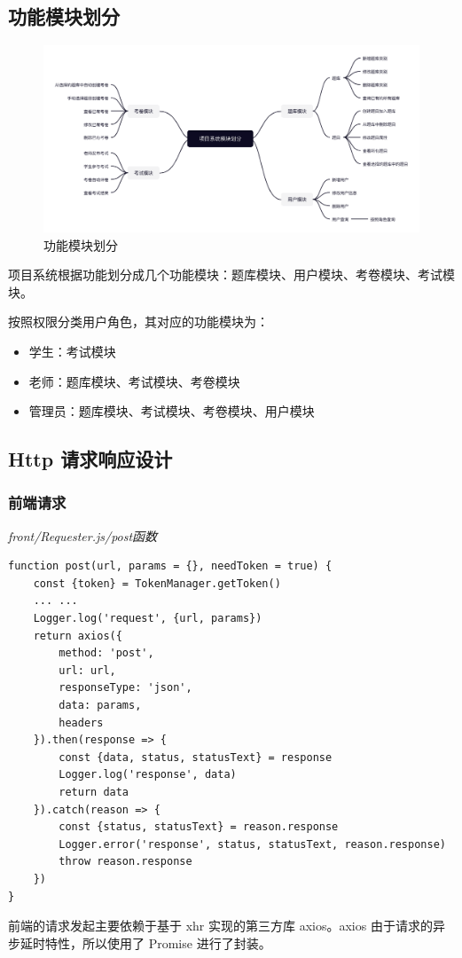 \subsection{功能模块划分}
\begin{figure}[htb]
    \centering
    \includegraphics[width=\linewidth]{_images/功能模块划分.png}
    \caption{功能模块划分}
\end{figure}
项目系统根据功能划分成几个功能模块：题库模块、用户模块、考卷模块、考试模块。

按照权限分类用户角色，其对应的功能模块为：
\begin{itemize}
    \item 学生：考试模块
    \item 老师：题库模块、考试模块、考卷模块
    \item 管理员：题库模块、考试模块、考卷模块、用户模块
\end{itemize}

\subsection{Http 请求响应设计}
\subsubsection{前端请求}
\noindent\textit{front/Requester.js/post函数}
\begin{lstlisting}
function post(url, params = {}, needToken = true) {
    const {token} = TokenManager.getToken()
    ... ...
    Logger.log('request', {url, params})
    return axios({
        method: 'post',
        url: url,
        responseType: 'json',
        data: params,
        headers
    }).then(response => {
        const {data, status, statusText} = response
        Logger.log('response', data)
        return data
    }).catch(reason => {
        const {status, statusText} = reason.response
        Logger.error('response', status, statusText, reason.response)
        throw reason.response
    })
}
\end{lstlisting}
前端的请求发起主要依赖于基于 xhr 实现的第三方库 axios。axios 由于请求的异步延时特性，所以使用了 Promise 进行了封装。

